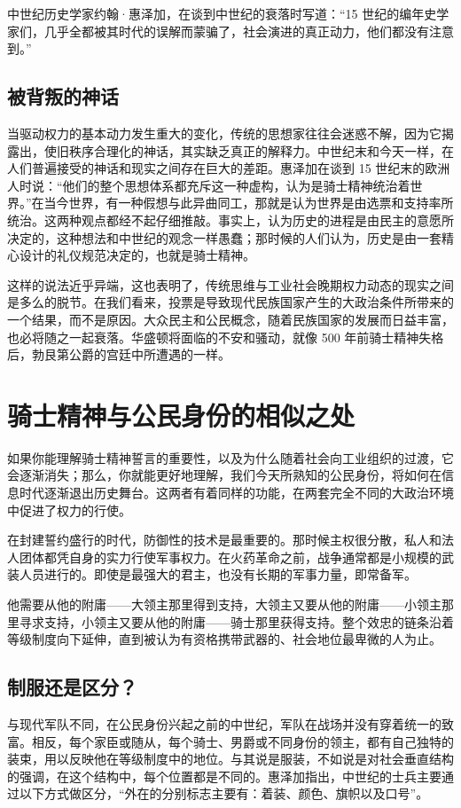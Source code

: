 中世纪历史学家约翰·惠泽加，在谈到中世纪的衰落时写道：“15 世纪的编年史学家们，几乎全都被其时代的误解而蒙骗了，社会演进的真正动力，他们都没有注意到。”

\subsection{被背叛的神话}
当驱动权力的基本动力发生重大的变化，传统的思想家往往会迷惑不解，因为它揭露出，使旧秩序合理化的神话，其实缺乏真正的解释力。中世纪末和今天一样，在人们普遍接受的神话和现实之间存在巨大的差距。惠泽加在谈到 15 世纪末的欧洲人时说：“他们的整个思想体系都充斥这一种虚构，认为是骑士精神统治着世界。”在当今世界，有一种假想与此异曲同工，那就是认为世界是由选票和支持率所统治。这两种观点都经不起仔细推敲。事实上，认为历史的进程是由民主的意愿所决定的，这种想法和中世纪的观念一样愚蠢；那时候的人们认为，历史是由一套精心设计的礼仪规范决定的，也就是骑士精神。

这样的说法近乎异端，这也表明了，传统思维与工业社会晚期权力动态的现实之间是多么的脱节。在我们看来，投票是导致现代民族国家产生的大政治条件所带来的一个结果，而不是原因。大众民主和公民概念，随着民族国家的发展而日益丰富，也必将随之一起衰落。华盛顿将面临的不安和骚动，就像 500 年前骑士精神失格后，勃艮第公爵的宫廷中所遭遇的一样。

\section{骑士精神与公民身份的相似之处}
如果你能理解骑士精神誓言的重要性，以及为什么随着社会向工业组织的过渡，它会逐渐消失；那么，你就能更好地理解，我们今天所熟知的公民身份，将如何在信息时代逐渐退出历史舞台。这两者有着同样的功能，在两套完全不同的大政治环境中促进了权力的行使。

在封建誓约盛行的时代，防御性的技术是最重要的。那时候主权很分散，私人和法人团体都凭自身的实力行使军事权力。在火药革命之前，战争通常都是小规模的武装人员进行的。即使是最强大的君主，也没有长期的军事力量，即常备军。

他需要从他的附庸——大领主那里得到支持，大领主又要从他的附庸——小领主那里寻求支持，小领主又要从他的附庸——骑士那里获得支持。整个效忠的链条沿着等级制度向下延伸，直到被认为有资格携带武器的、社会地位最卑微的人为止。

\subsection{制服还是区分？}
与现代军队不同，在公民身份兴起之前的中世纪，军队在战场并没有穿着统一的致富。相反，每个家臣或随从，每个骑士、男爵或不同身份的领主，都有自己独特的装束，用以反映他在等级制度中的地位。与其说是服装，不如说是对社会垂直结构的强调，在这个结构中，每个位置都是不同的。惠泽加指出，中世纪的士兵主要通过以下方式做区分，“外在的分别标志主要有：着装、颜色、旗帜以及口号”。

